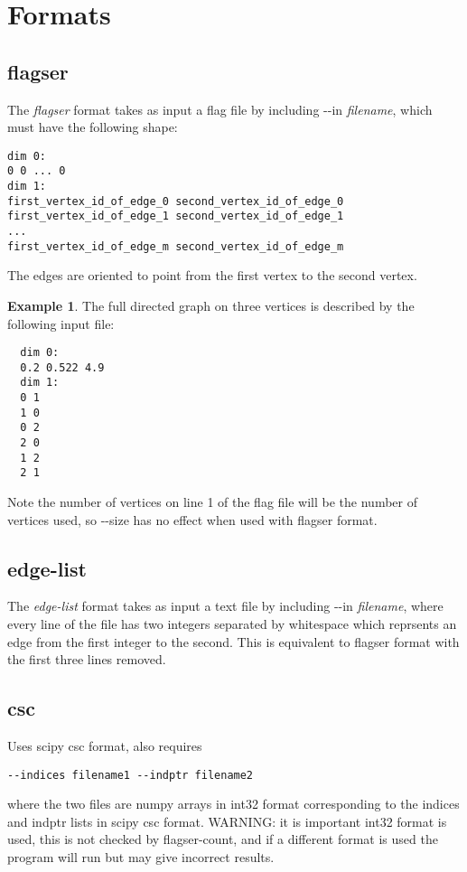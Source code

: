 \documentclass{amsart}
\theoremstyle{definition}
\newtheorem*{example*}{Example}
\begin{document}
\vspace{1em}

\section{Formats}
\subsection{flagser}
\noindent
The \textit{flagser} format takes as input a flag file by including -{}-in \textit{filename}, which must have the following shape:

\vspace{.5em}
\begin{verbatim}
dim 0:
0 0 ... 0
dim 1:
first_vertex_id_of_edge_0 second_vertex_id_of_edge_0
first_vertex_id_of_edge_1 second_vertex_id_of_edge_1
...
first_vertex_id_of_edge_m second_vertex_id_of_edge_m
\end{verbatim}
\vspace{.5em}

\noindent
The edges are oriented to point from the first vertex to the second vertex.

\begin{example*}
  The full directed graph on three vertices is described by the
  following input file:

  \vspace{.5em}
  \begin{verbatim}
  dim 0:
  0.2 0.522 4.9
  dim 1:
  0 1
  1 0
  0 2
  2 0
  1 2
  2 1
  \end{verbatim}
\end{example*}

Note the number of vertices on line 1 of the flag file will be the number of vertices used, so -{}-size has no effect when used with flagser format.

\subsection{edge-list}
The \textit{edge-list} format takes as input a text file by including -{}-in \textit{filename}, where every line of the file has two integers separated by whitespace which reprsents an edge from the first integer to the second. This is equivalent to flagser format with the first three lines removed.

\subsection{csc}
Uses scipy csc format, also requires
\begin{verbatim}--indices filename1 --indptr filename2\end{verbatim}
where the two files are numpy arrays in int32 format corresponding to the indices and indptr lists in scipy csc format. WARNING: it is important int32 format is used, this is not checked by flagser-count, and if a different format is used the program will run but may give incorrect results.
\end{document}

